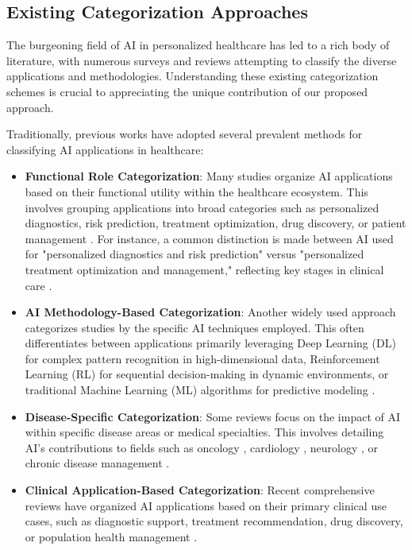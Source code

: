 \documentclass[runningheads]{llncs}
\begin{document}
\subsection{Existing Categorization Approaches}
The burgeoning field of AI in personalized healthcare has led to a rich body of literature, with numerous surveys and reviews attempting to classify the diverse applications and methodologies. Understanding these existing categorization schemes is crucial to appreciating the unique contribution of our proposed approach.

Traditionally, previous works have adopted several prevalent methods for classifying AI applications in healthcare:

\begin{itemize}
    \item \textbf{Functional Role Categorization}: Many studies organize AI applications based on their functional utility within the healthcare ecosystem. This involves grouping applications into broad categories such as personalized diagnostics, risk prediction, treatment optimization, drug discovery, or patient management \cite{alum2025artificial,kumar2024artificial}. For instance, a common distinction is made between AI used for "personalized diagnostics and risk prediction" versus "personalized treatment optimization and management," reflecting key stages in clinical care \cite{article_1,article_18,article_2}.

    \item \textbf{AI Methodology-Based Categorization}: Another widely used approach categorizes studies by the specific AI techniques employed. This often differentiates between applications primarily leveraging Deep Learning (DL) for complex pattern recognition in high-dimensional data, Reinforcement Learning (RL) for sequential decision-making in dynamic environments, or traditional Machine Learning (ML) algorithms for predictive modeling \cite{article_22,article_23,article_18,article_11,ml_dl_advances_2023}.

    \item \textbf{Disease-Specific Categorization}: Some reviews focus on the impact of AI within specific disease areas or medical specialties. This involves detailing AI's contributions to fields such as oncology \cite{raza2024artificial,article_19}, cardiology \cite{article_6,article_8}, neurology \cite{article_3}, or chronic disease management \cite{article_9,article_2,article_22}.

    \item \textbf{Clinical Application-Based Categorization}: Recent comprehensive reviews have organized AI applications based on their primary clinical use cases, such as diagnostic support, treatment recommendation, drug discovery, or population health management \cite{singh2024comprehensive,ai_healthcare_transform_2023}.
\end{itemize}
\end{document}
